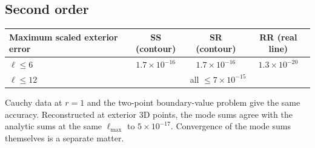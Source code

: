 \documentclass[11pt,a4paper]{article}
\begin{document}
\subsection{Second order}
\begin{center}
\small
\renewcommand{\arraystretch}{1.2}
\begin{tabular}{@{}lccc@{}}
\toprule
Maximum scaled exterior error & SS (contour) & SR (contour) & RR (real line)\\
\midrule
$\ell\le6$ & $1.7\times10^{-16}$ & $1.7\times10^{-16}$ & $1.3\times10^{-20}$\\
$\ell\le12$ & \multicolumn{3}{c}{all $\le7\times10^{-15}$}\\
\bottomrule
\end{tabular}
\end{center}
Cauchy data at $r=1$ and the two-point boundary-value problem give the same accuracy.
Reconstructed at exterior 3D points, the mode sums agree with the analytic sums at the same $\ell_{\max}$ to $5\times10^{-17}$.
Convergence of the mode sums themselves is a separate matter.
\end{document}
